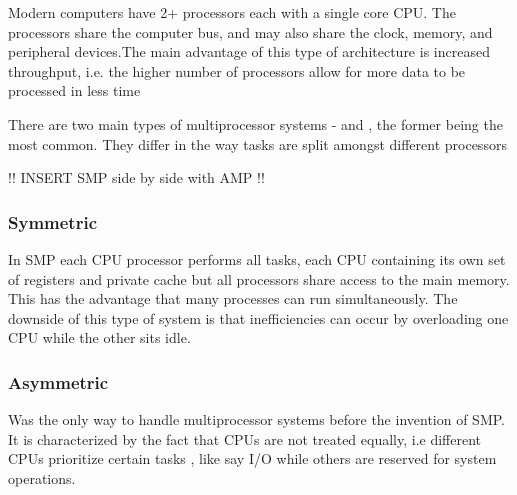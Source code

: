 

		\par{Modern computers have 2+ processors each with a single core CPU. The processors share the computer bus, and may also share the clock, memory, and peripheral devices.The main advantage of this type of architecture is increased throughput, i.e. the higher number of processors allow for more data to be processed in less time}


		\par{There are two main types of multiprocessor systems -  and , the former being the most common. They differ in the way tasks are split amongst different processors}

		!! INSERT SMP side by side with AMP !!

		\subsubsection{Symmetric}

			\par{In SMP each CPU processor performs all tasks, each CPU containing its own set of registers and private cache but all processors share access to the main memory. This has the advantage that many processes can run simultaneously. The downside of this type of system is that inefficiencies can occur by overloading one CPU while the other sits idle.}


		\subsubsection{Asymmetric}

			\par{Was the only way to handle multiprocessor systems before the invention of SMP. It is characterized by the fact that CPUs are not treated equally, i.e different CPUs prioritize certain tasks , like say I/O while others are reserved for system operations.}

